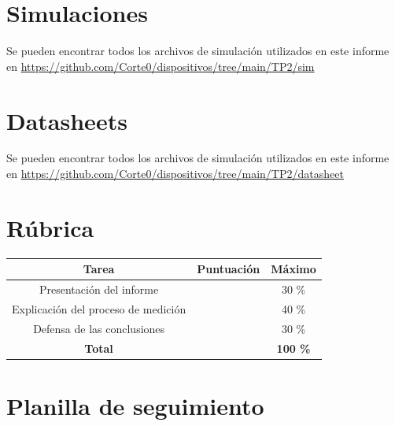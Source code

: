 \section{Simulaciones}
\label{con:simulaciones}
Se pueden encontrar todos los archivos de simulación utilizados en este informe en \url{https://github.com/Corte0/dispositivos/tree/main/TP2/sim}

\section{Datasheets}
\label{con:simulaciones}
Se pueden encontrar todos los archivos de simulación utilizados en este informe en \url{https://github.com/Corte0/dispositivos/tree/main/TP2/datasheet}

\section{Rúbrica}

\begin{table}[H]
  \centering
  \begin{tabular}{|c|c|c|}
    \hline
    \rowcolor[gray]{0.8}
    \textbf{Tarea} & \textbf{Puntuación} & \textbf{Máximo} \\
    \hline
    Presentación del informe & & 30 \% \\
    \hline
    Explicación del proceso de medición & & 40 \% \\
    \hline
    Defensa de las conclusiones & & 30 \% \\
    \hline
    \textbf{Total} & & \textbf{100 \%} \\
    \hline
  \end{tabular}
\end{table}

\section{Planilla de seguimiento}

